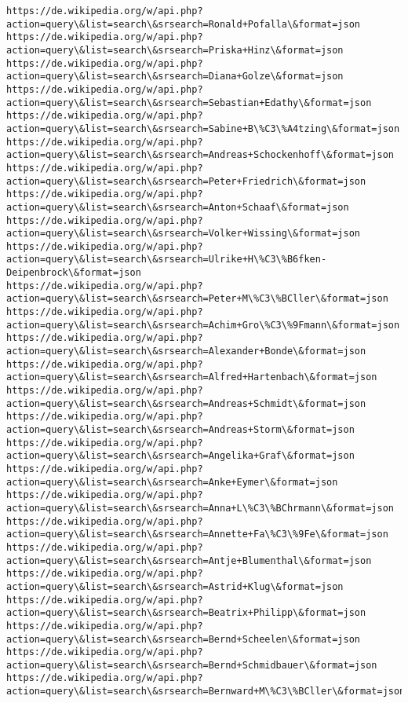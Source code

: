 \documentclass[11pt]{article}
\begin{document}
\begin{Verbatim}[commandchars=\\\{\}]
https://de.wikipedia.org/w/api.php?action=query\&list=search\&srsearch=Ronald+Pofalla\&format=json
https://de.wikipedia.org/w/api.php?action=query\&list=search\&srsearch=Priska+Hinz\&format=json
https://de.wikipedia.org/w/api.php?action=query\&list=search\&srsearch=Diana+Golze\&format=json
https://de.wikipedia.org/w/api.php?action=query\&list=search\&srsearch=Sebastian+Edathy\&format=json
https://de.wikipedia.org/w/api.php?action=query\&list=search\&srsearch=Sabine+B\%C3\%A4tzing\&format=json
https://de.wikipedia.org/w/api.php?action=query\&list=search\&srsearch=Andreas+Schockenhoff\&format=json
https://de.wikipedia.org/w/api.php?action=query\&list=search\&srsearch=Peter+Friedrich\&format=json
https://de.wikipedia.org/w/api.php?action=query\&list=search\&srsearch=Anton+Schaaf\&format=json
https://de.wikipedia.org/w/api.php?action=query\&list=search\&srsearch=Volker+Wissing\&format=json
https://de.wikipedia.org/w/api.php?action=query\&list=search\&srsearch=Ulrike+H\%C3\%B6fken-Deipenbrock\&format=json
https://de.wikipedia.org/w/api.php?action=query\&list=search\&srsearch=Peter+M\%C3\%BCller\&format=json
https://de.wikipedia.org/w/api.php?action=query\&list=search\&srsearch=Achim+Gro\%C3\%9Fmann\&format=json
https://de.wikipedia.org/w/api.php?action=query\&list=search\&srsearch=Alexander+Bonde\&format=json
https://de.wikipedia.org/w/api.php?action=query\&list=search\&srsearch=Alfred+Hartenbach\&format=json
https://de.wikipedia.org/w/api.php?action=query\&list=search\&srsearch=Andreas+Schmidt\&format=json
https://de.wikipedia.org/w/api.php?action=query\&list=search\&srsearch=Andreas+Storm\&format=json
https://de.wikipedia.org/w/api.php?action=query\&list=search\&srsearch=Angelika+Graf\&format=json
https://de.wikipedia.org/w/api.php?action=query\&list=search\&srsearch=Anke+Eymer\&format=json
https://de.wikipedia.org/w/api.php?action=query\&list=search\&srsearch=Anna+L\%C3\%BChrmann\&format=json
https://de.wikipedia.org/w/api.php?action=query\&list=search\&srsearch=Annette+Fa\%C3\%9Fe\&format=json
https://de.wikipedia.org/w/api.php?action=query\&list=search\&srsearch=Antje+Blumenthal\&format=json
https://de.wikipedia.org/w/api.php?action=query\&list=search\&srsearch=Astrid+Klug\&format=json
https://de.wikipedia.org/w/api.php?action=query\&list=search\&srsearch=Beatrix+Philipp\&format=json
https://de.wikipedia.org/w/api.php?action=query\&list=search\&srsearch=Bernd+Scheelen\&format=json
https://de.wikipedia.org/w/api.php?action=query\&list=search\&srsearch=Bernd+Schmidbauer\&format=json
https://de.wikipedia.org/w/api.php?action=query\&list=search\&srsearch=Bernward+M\%C3\%BCller\&format=json

\end{Verbatim}
\end{document}
